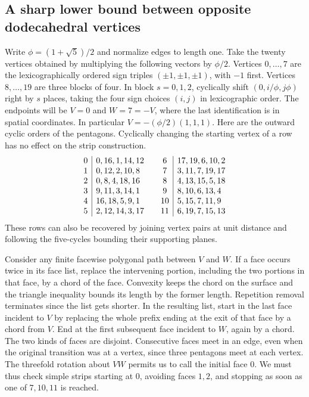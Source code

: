\subsection{A sharp lower bound between opposite dodecahedral vertices}
\label{sec:dodlower}

Write $\phi=(1+\sqrt5)/2$ and normalize edges to length one.
Take the twenty vertices obtained by multiplying the following vectors by
$\phi/2$. Vertices $0,\ldots,7$ are the lexicographically ordered sign
triples $(\pm1,\pm1,\pm1)$, with $-1$ first. Vertices $8,\ldots,19$ are
three blocks of four. In block $s=0,1,2$, cyclically shift
$(0,i/\phi,j\phi)$ right by $s$ places, taking the four sign choices
$(i,j)$ in lexicographic order.
The endpoints will be $V=0$ and $W=7=-V$, where the last identification
is in spatial coordinates. In particular $V=-(\phi/2)(1,1,1)$.
Here are the outward cyclic orders of the pentagons. Cyclically changing
the starting vertex of a row has no effect on the strip construction.
\[
\begin{array}{c|l@{\qquad}c|l}
0&0,16,1,14,12 &6&17,19,6,10,2\\
1&0,12,2,10,8 &7&3,11,7,19,17\\
2&0,8,4,18,16 &8&4,13,15,5,18\\
3&9,11,3,14,1 &9&8,10,6,13,4\\
4&16,18,5,9,1 &10&5,15,7,11,9\\
5&2,12,14,3,17 &11&6,19,7,15,13
\end{array}
\]
These rows can also be recovered by joining vertex pairs at unit distance
and following the five-cycles bounding their supporting planes.

Consider any finite facewise polygonal path between $V$ and $W$.
If a face occurs twice in its face list, replace the intervening portion,
including the two portions in that face, by a chord of the face. Convexity
keeps the chord on the surface and the triangle inequality bounds its
length by the former length. Repetition removal terminates since the list
gets shorter. In the resulting list, start in the last face incident to
$V$ by replacing the whole prefix ending at the exit of that face by a
chord from $V$. End at the first subsequent face incident to $W$, again
by a chord. The two kinds of faces are disjoint. Consecutive faces meet
in an edge, even when the original transition was at a vertex, since
three pentagons meet at each vertex. The threefold rotation about
$VW$ permits us to call the initial face $0$. We must thus check simple
strips starting at $0$, avoiding faces $1,2$, and stopping as soon as
one of $7,10,11$ is reached.

